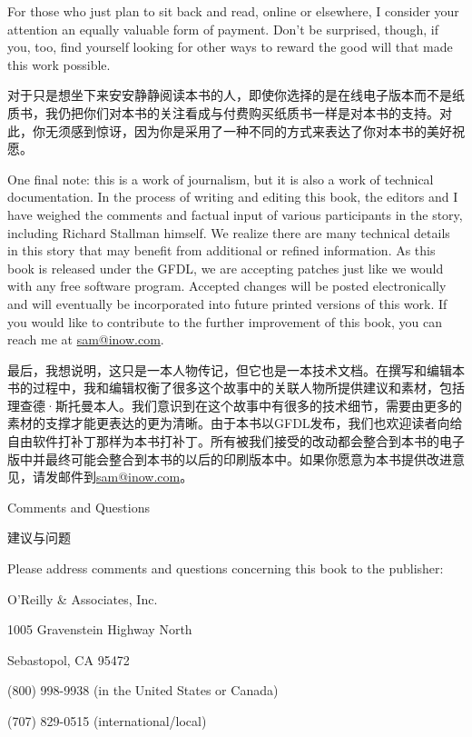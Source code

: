 \ifdefined\eng
For those who just plan to sit back and read, online or elsewhere, I consider your attention an equally valuable form of payment. Don't be surprised, though, if you, too, find yourself looking for other ways to reward the good will that made this work possible.
\fi

\ifdefined\chs
对于只是想坐下来安安静静阅读本书的人，即使你选择的是在线电子版本而不是纸质书，我仍把你们对本书的关注看成与付费购买纸质书一样是对本书的支持。对此，你无须感到惊讶，因为你是采用了一种不同的方式来表达了你对本书的美好祝愿。
\fi

\ifdefined\eng
One final note: this is a work of journalism, but it is also a work of technical documentation. In the process of writing and editing this book, the editors and I have weighed the comments and factual input of various participants in the story, including Richard Stallman himself. We realize there are many technical details in this story that may benefit from additional or refined information. As this book is released under the GFDL, we are accepting patches just like we would with any free software program. Accepted changes will be posted electronically and will eventually be incorporated into future printed versions of this work. If you would like to contribute to the further improvement of this book, you can reach me at \url{sam@inow.com}.
\fi

\ifdefined\chs
最后，我想说明，这只是一本人物传记，但它也是一本技术文档。在撰写和编辑本书的过程中，我和编辑权衡了很多这个故事中的关联人物所提供建议和素材，包括理查德·斯托曼本人。我们意识到在这个故事中有很多的技术细节，需要由更多的素材的支撑才能更表达的更为清晰。由于本书以GFDL发布，我们也欢迎读者向给自由软件打补丁那样为本书打补丁。所有被我们接受的改动都会整合到本书的电子版中并最终可能会整合到本书的以后的印刷版本中。如果你愿意为本书提供改进意见，请发邮件到\url{sam@inow.com}。
\fi

\ifdefined\eng
Comments and Questions
\fi

\ifdefined\chs
建议与问题
\fi

\ifdefined\eng
Please address comments and questions concerning this book to the publisher:

O'Reilly \& Associates, Inc. 

1005 Gravenstein Highway North 

Sebastopol, CA 95472 

(800) 998-9938 (in the United States or Canada) 

(707) 829-0515 (international/local) 

